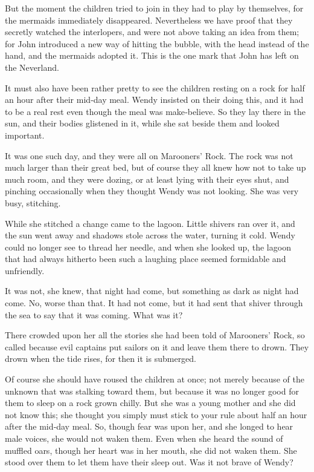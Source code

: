 But the moment the children tried to join in they had to play by themselves, for the mermaids immediately disappeared.
Nevertheless we have proof that they secretly watched the interlopers,
and were not above taking an idea from them;
for John introduced a new way of hitting the bubble, with the head instead of the hand,
and the mermaids adopted it.
This is the one mark that John has left on the Neverland.

It must also have been rather pretty to see the children resting on a rock for half an hour after their mid‐day meal.
Wendy insisted on their doing this, and it had to be a real rest even though the meal was make‐believe.
So they lay there in the sun, and their bodies glistened in it, while she sat beside them and looked important.

It was one such day, and they were all on Marooners’ Rock.
The rock was not much larger than their great bed, but of course they all knew how not to take up much room,
and they were dozing, or at least lying with their eyes shut,
and pinching occasionally when they thought Wendy was not looking.
She was very busy, stitching.

While she stitched a change came to the lagoon.
Little shivers ran over it, and the sun went away and shadows stole across the water, turning it cold.
Wendy could no longer see to thread her needle,
and when she looked up, the lagoon that had always hitherto been such a laughing place
seemed formidable and unfriendly.

It was not, she knew, that night had come, but something as dark as night had come.
No, worse than that.
It had not come, but it had sent that shiver through the sea to say that it was coming.
What was it?

There crowded upon her all the stories she had been told of Marooners’ Rock,
so called because evil captains put sailors on it and leave them there to drown.
They drown when the tide rises, for then it is submerged.

Of course she should have roused the children at once;
not merely because of the unknown that was stalking toward them,
but because it was no longer good for them to sleep on a rock grown chilly.
But she was a young mother and she did not know this;
she thought you simply must stick to your rule about half an hour after the mid‐day meal.
So, though fear was upon her, and she longed to hear male voices, she would not waken them.
Even when she heard the sound of muffled oars, though her heart was in her mouth, she did not waken them.
She stood over them to let them have their sleep out.
Was it not brave of Wendy?


